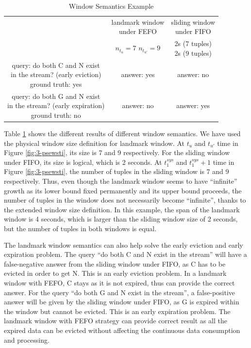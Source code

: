 \begin{table}[!htbp]
	\centering
	\caption{Window Semantics Example}
	\label{tab:lwsw}
	\begin{tabular}{|c||c|c|}
	\hline
	& \makecell{landmark window \\ under FEFO} & \makecell{sliding window \\ under FIFO} \\ \hhline{|=#=|=|}
	\makecell{window size} & \makecell{$n_{t_{u}} = 7$\\ $n_{t_{u'}} = 9$} & \makecell{2s (7 tuples)\\ 2s (9 tuples)} \\ \hline
	\makecell{query: do both C and N exist \\ in the stream? (early eviction) \\ ground truth: yes } & answer: yes  & answer: no \\ \hline
	\makecell{query: do both G and N exist \\ in the stream? (early expiration) \\ ground truth: no} & answer: no & answer: yes \\ \hline
	\end{tabular}
\end{table}

Table \ref{tab:lwsw} shows the different results of different window semantics. 
We have used the physical window size definition for landmark window. 
At $t_{u}$ and $t_{u'}$ time in Figure \ref{fig:3-psewsti}, its size is 7 and 9 respectively. 
For the sliding window under FIFO, its size is logical, which is 2 seconds. 
At $t_{1}^{sys}$ and $t_{1}^{sys} + 1$ time in Figure \ref{fig:3-psewsti}, the number of tuples in the sliding window is 7 and 9 respectively.
Thus, even though the landmark window seems to have ``infinite'' growth as its lower bound fixed permanently and its upper bound proceeds, the number of tuples in the window does not necessarily become ``infinite'', thanks to the extended window size definition. 
In this example, the span of the landmark window is 4 seconds, which is larger than the sliding window size of 2 seconds, but the number of tuples in both windows is equal.

The landmark window semantics can also help solve the early eviction and early expiration problem. 
The query ``do both C and N exist in the stream'' will have a false-negative answer from the sliding window under FIFO, as C has to be evicted in order to get N. 
This is an early eviction problem.
In a landmark window with FEFO, C stays as it is not expired, thus can provide the correct answer. 
For the query ``do both G and N exist in the stream'', a false-positive answer will be given by the sliding window under FIFO, as G is expired within the window but cannot be evicted. 
This is an early expiration problem.
The landmark window with FEFO strategy can provide correct result as all the expired data can be evicted without affecting the continuous data consumption and processing.  
%
